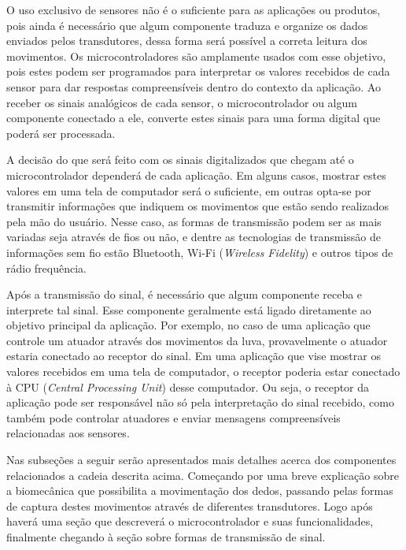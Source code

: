 \documentclass[
	12pt,				%
	openright,			%
	oneside,			%
	a4paper,			%
	english,			%
	brazil				%
	]{abntex2}
\begin{document}
		O uso exclusivo de sensores não é o suficiente para as aplicações ou produtos, pois ainda é necessário que algum componente traduza e organize os dados enviados pelos transdutores, dessa forma será possível a correta leitura dos movimentos. Os microcontroladores são amplamente usados com esse objetivo, pois estes podem ser programados para interpretar os valores recebidos de cada sensor para dar respostas compreensíveis dentro do contexto da aplicação. Ao receber os sinais analógicos de cada sensor, o microcontrolador ou algum componente conectado a ele, converte estes sinais para uma forma digital que poderá ser processada. 
	
		A decisão do que será feito com os sinais digitalizados que chegam até o microcontrolador dependerá de cada aplicação. Em alguns casos, mostrar estes valores em uma tela de computador será o suficiente, em outras opta-se por transmitir informações que indiquem os movimentos que estão sendo realizados pela mão do usuário. Nesse caso, as formas de transmissão podem ser as mais variadas seja através de fios ou não, e dentre as tecnologias de transmissão de informações sem fio estão Bluetooth, Wi-Fi (\textit{Wireless Fidelity}) e outros tipos de rádio frequência.

		Após a transmissão do sinal, é necessário que algum componente receba e interprete tal sinal. Esse componente geralmente está ligado diretamente ao objetivo principal da aplicação. Por exemplo, no caso de uma aplicação que controle um atuador através dos movimentos da luva, provavelmente o atuador estaria conectado ao receptor do sinal. Em uma aplicação que vise mostrar os valores recebidos em uma tela de computador, o receptor poderia estar conectado à CPU (\textit{Central Processing Unit}) desse computador. Ou seja, o receptor da aplicação pode ser responsável não só pela interpretação do sinal recebido, como também pode controlar atuadores e enviar mensagens compreensíveis relacionadas aos sensores.

		Nas subseções a seguir serão apresentados mais detalhes acerca dos componentes relacionados a cadeia descrita acima. Começando por uma breve explicação sobre a biomecânica que possibilita a movimentação dos dedos, passando pelas formas de captura destes movimentos através de diferentes transdutores. Logo após haverá uma seção que descreverá o microcontrolador e suas funcionalidades, finalmente chegando à seção sobre formas de transmissão de sinal.



\end{document}
